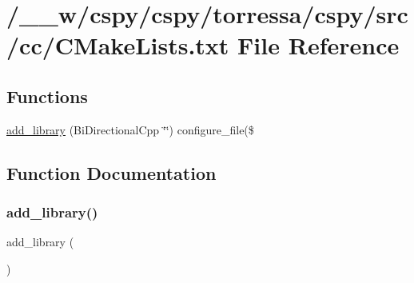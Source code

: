 \hypertarget{CMakeLists_8txt}{}\section{/\+\_\+\+\_\+w/cspy/cspy/torressa/cspy/src/cc/\+C\+Make\+Lists.txt File Reference}
\label{CMakeLists_8txt}
\subsection*{Functions}
\begin{DoxyCompactItemize}
\item 
\hyperlink{CMakeLists_8txt_a30b21a2f5b025b5bf7cdd639acbc26b2}{add\+\_\+library} (Bi\+Directional\+Cpp \char`\"{}\char`\"{}) configure\+\_\+file(\$
\end{DoxyCompactItemize}


\subsection{Function Documentation}
\mbox{\label{CMakeLists_8txt_a30b21a2f5b025b5bf7cdd639acbc26b2}} 
\subsubsection{\texorpdfstring{add\+\_\+library()}{add\_library()}}
{\footnotesize\ttfamily add\+\_\+library (\begin{DoxyParamCaption}\item[{Bi\+Directional\+Cpp \char`\"{}\char`\"{}}]{ }\end{DoxyParamCaption})}

